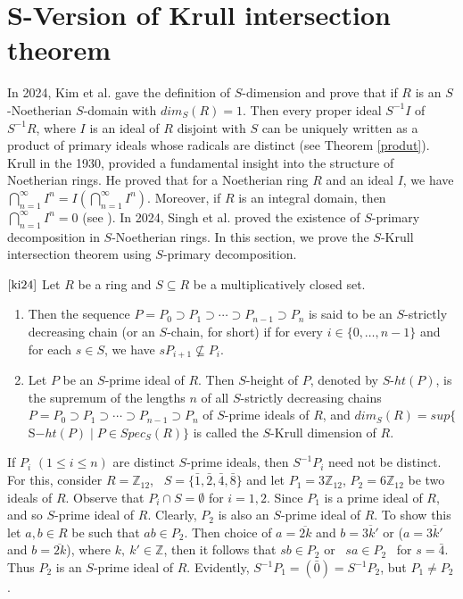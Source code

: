 \documentclass[11pt]{article}
\begin{document}
	\section{$\mathbf{S}$-Version of Krull intersection theorem}
	In 2024, Kim et al. \cite{ki24} gave the definition of $S$-dimension and prove that if $R$ is an $S$-Noetherian $S$-domain with $dim_{S}(R)=1$. Then every proper ideal $S^{-1}I$ of $S^{-1}R$, where $I$ is an ideal of $R$ disjoint with $S$ can be uniquely written as a product of primary ideals whose radicals are distinct (see Theorem \ref{produt}). Krull in the 1930, provided a fundamental insight into the structure of Noetherian rings. He proved that for a Noetherian ring $R$ and an ideal $I$, we have $\bigcap\limits_{n=1}^{\infty}I^{n}=I(\bigcap\limits_{n=1}^{\infty}I^{n})$. Moreover, if $R$ is an integral domain, then $\bigcap\limits_{n=1}^{\infty}I^{n}=0$ (see \cite{ad75}). In 2024, Singh et al. \cite{ts24} proved the existence of $S$-primary decomposition in $S$-Noetherian rings. In this section, we prove the $S$-Krull intersection theorem using $S$-primary decomposition. 
	\begin{deff}$\cite{ki24}$
		Let $R$ be a ring and $S \subseteq R$ be a multiplicatively closed set. 
		\begin{enumerate}
			\item Then the sequence $P = P_{0} \supset P_1\supset\cdots \supset P_{n-1} \supset P_{n}$ is said to be an $S$-strictly decreasing chain (or an $S$-chain, for short) if for every $i\in\{0, \ldots, n-1\}$ and for each $s\in S$, we have $sP_{i+1}\nsubseteq P_i$.
			\item 	Let $P$ be an $S$-prime ideal of $R$. Then $S$-height of $P$, denoted by $S$-$ht(P)$, is the supremum of the lengths $n$ of all $S$-strictly decreasing chains $P = P_{0} \supset P_1\supset\cdots \supset P_{n-1} \supset P_{n}$ of $S$-prime ideals of $R$, and $dim_{S}(R) = sup\{$S$-ht(P)\mid P\in Spec_{S}(R)\}$ is called the $S$-Krull dimension of $R$.
		\end{enumerate}
	\end{deff}
	\begin{rem}\label{sp}
		If $P_{i}$ $(1\leq i\leq n)$ are distinct $S$-prime ideals, then $S^{-1}P_{i}$ need not be distinct. For this, consider $R=\mathbb{Z}_{12}$, ~$S=\{\bar{1}, \bar{2},\bar{4}, \bar{8}\}$ and let $P_{1}=3\mathbb{Z}_{12}$, $P_{2}=6\mathbb{Z}_{12}$ be two ideals of $R$. Observe that $P_{i}\cap S=\emptyset$ for $i=1, 2$. Since $P_{1}$ is a prime ideal of $R$, and so $S$-prime ideal of $R$. Clearly, $P_{2}$ is also an $S$-prime ideal of $R$. To show this let $a, b\in R$ be such that $ab\in P_{2}$. Then choice of $a=\overline{2k}$ and $b=\overline{3k'}$ or ($a=\overline{3k'}$ and $b=\overline{2k}$), where $k, ~k'\in\mathbb{Z}$, then it follows that $sb\in P_{2}$ or ~$sa\in P_{2}$~ for $s=\bar{4}$. Thus $P_{2}$ is an $S$-prime ideal of $R$. Evidently, $S^{-1}P_{1}=(\bar{0})=S^{-1}P_{2}$, but $P_{1}\neq P_{2}$.
	\end{rem}
\end{document}
